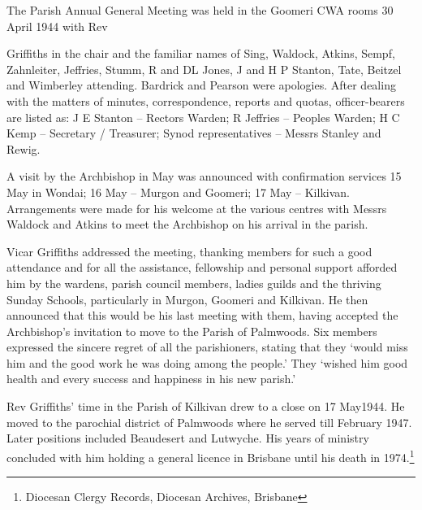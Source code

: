 The Parish Annual General Meeting was held in the Goomeri CWA rooms 30 April 1944 with Rev



Griffiths in the chair and the familiar names of Sing, Waldock, Atkins, Sempf, Zahnleiter, Jeffries, Stumm, R and DL Jones, J and H P Stanton, Tate, Beitzel and Wimberley attending. Bardrick and Pearson were apologies. After dealing with the matters of minutes, correspondence, reports and quotas, officer-bearers are listed as: J E Stanton -- Rectors Warden; R Jeffries -- Peoples Warden; H C Kemp -- Secretary / Treasurer; Synod representatives -- Messrs Stanley and Rewig.



A visit by the Archbishop in May was announced with confirmation services 15 May in Wondai; 16 May -- Murgon and Goomeri; 17 May -- Kilkivan. Arrangements were made for his welcome at the various centres with Messrs Waldock and Atkins to meet the Archbishop on his arrival in the parish.



Vicar Griffiths addressed the meeting, thanking members for such a good attendance and for all the assistance, fellowship and personal support afforded him by the wardens, parish council members, ladies guilds and the thriving Sunday Schools, particularly in Murgon, Goomeri and Kilkivan. He then announced that this would be his last meeting with them, having accepted the Archbishop's invitation to move to the Parish of Palmwoods. Six members expressed the sincere regret of all the parishioners, stating that they `would miss him and the good work he was doing among the people.' They `wished him good health and every success and happiness in his new parish.'



Rev Griffiths' time in the Parish of Kilkivan drew to a close on 17 May1944. He moved to the parochial district of Palmwoods where he served till February 1947. Later positions included Beaudesert and Lutwyche. His years of ministry concluded with him holding a general licence in Brisbane until his death in 1974.\footnote{Diocesan Clergy Records, Diocesan Archives, Brisbane}


\balance


